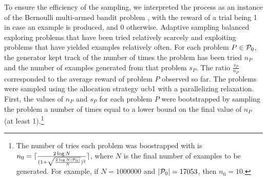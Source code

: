 To ensure the efficiency of the sampling, we interpreted the process as an instance of the Bernoulli multi-armed bandit problem \cite{Sutton1998},
with the reward of a trial being 1 in case an example is produced, and 0 otherwise.
Adaptive sampling balanced
exploring problems that have been tried relatively scarcely and
exploiting problems that have yielded examples relatively often.
For each problem $P \in \operatorname{\mathcal{P}_{0}}$,
the generator kept track of the number of times the problem has been tried $n_P$
and the number of examples generated from that problem $s_P$.
The ratio $\frac{s_P}{n_P}$ corresponded to the average reward of problem $P$ observed so far.
The problems were sampled using the allocation strategy \acrshort{ucb1} \cite{Auer2002} with a parallelizing relaxation.
First, the values of $n_P$ and $s_P$ for each problem $P$ were bootstrapped by sampling the problem a number of times equal to a lower bound on the final value of $n_P$ (at least 1).\footnote{The number of tries each problem was boostrapped with is
$n_0 = \lceil\frac{2 \log{N}}{(1 + \sqrt{\frac{2 \log{N} \lvert\operatorname{\mathcal{P}_{0}}\rvert}{N}})^2}\rceil$,
where $N$ is the final number of examples to be generated.
For example, if $N=1000000$ and $\lvert\operatorname{\mathcal{P}_{0}}\rvert=17053$, then $n_0 = 10$.}
